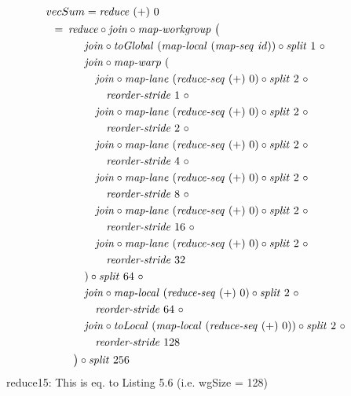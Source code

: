 \begin{align}
  &\hspace{-1.5em}vecSum = \reduce\ (+)\ 0\nonumber\\
  &\hspace{-2em}\quad\begin{aligned}
    &=\hspace{.2em}
      \reduce \circ \join \circ \mapWorkgroup\ \big(\\
    &\qquad\quad \join \circ \toGlobal\ (\mapLocal\ (\mapSeq\ \id)) \circ \splitN\ 1\ \circ\\
    &\qquad\quad \join \circ \mapWarp\ (\\
    &\qquad\qquad \join \circ \mapLane\ (\reduceSeq\ (+)\ 0) \circ \splitN\ 2\ \circ\\
    &\qquad\qquad\quad \reorderStride\ 1\ \circ\\
    &\qquad\qquad \join \circ \mapLane\ (\reduceSeq\ (+)\ 0) \circ \splitN\ 2\ \circ\\
    &\qquad\qquad\quad \reorderStride\ 2\ \circ\\
    &\qquad\qquad \join \circ \mapLane\ (\reduceSeq\ (+)\ 0) \circ \splitN\ 2\ \circ\\
    &\qquad\qquad\quad \reorderStride\ 4\ \circ\\
    &\qquad\qquad \join \circ \mapLane\ (\reduceSeq\ (+)\ 0) \circ \splitN\ 2\ \circ\\
    &\qquad\qquad\quad \reorderStride\ 8\ \circ\\
    &\qquad\qquad \join \circ \mapLane\ (\reduceSeq\ (+)\ 0) \circ \splitN\ 2\ \circ\\
    &\qquad\qquad\quad \reorderStride\ 16\ \circ\\
    &\qquad\qquad \join \circ \mapLane\ (\reduceSeq\ (+)\ 0) \circ \splitN\ 2\ \circ\\
    &\qquad\qquad\quad \reorderStride\ 32\\
    &\qquad\quad) \circ \splitN\ 64\ \circ\\
    &\qquad\quad \join \circ \mapLocal\ (\reduceSeq\ (+)\ 0) \circ \splitN\ 2\ \circ\\
    &\qquad\qquad \reorderStride\ 64\ \circ\\
    &\qquad\quad \join \circ \toLocal\ (\mapLocal\ (\reduceSeq\ (+)\ 0)) \circ \splitN\ 2\ \circ\\
    &\qquad\qquad \reorderStride\ 128\\
    &\qquad\big) \circ \splitN\ 256
  \end{aligned}
\end{align}
reduce15: This is eq. to Listing 5.6 (i.e. wgSize = 128)

